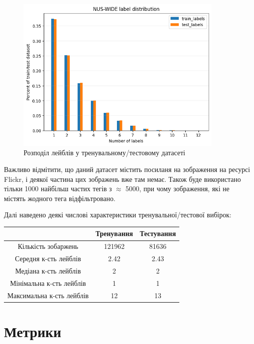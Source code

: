 \documentclass{udstu}
\begin{document}
\begin{figure}[!ht]
	\centering
	\includegraphics[width=0.9\textwidth]{PNG/nus-wide-dist}
	\caption{Розподіл лейблів у тренувальному/тестовому датасеті}
	\label{figure:nus-wide-dist}
\end{figure}

Важливо відмітити, що даний датасет містить посиланя на зображення на ресурсі Flickr, і деякої частина цих
зображень вже там немає. Також буде використано тільки 1000 найбільш частих тегів з $\approx$ 5000,
при чому зображення, які не містять жодного тега відфільтровано.

Далі наведено деякі числові характеристики тренувальної/тестової вибірок:

\begin{center}
\begin{tabular}{ccc}
		\toprule[2pt]
           & Тренування & Тестування \\
        \midrule
        Кількість зобаржень & 121962  & 81636 \\
        Середня к-сть лейблів & 2.42  & 2.43 \\
        Медіана к-сть лейблів & 2  & 2 \\
        Мінімальна к-сть лейблів & 1  & 1 \\
        Максимальна к-сть лейблів & 12  & 13 \\
        \bottomrule[2pt]
\end{tabular}
\end{center}

\clearpage


\section{Метрики}
\label{metrics}
\end{document}
